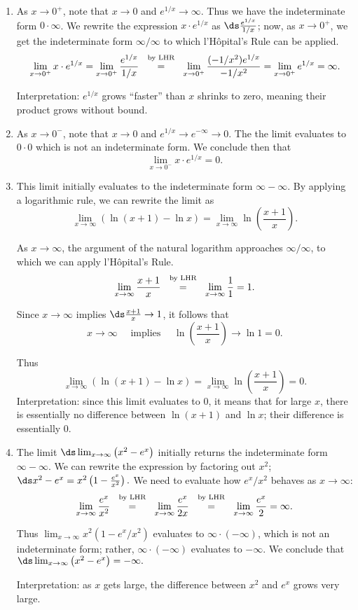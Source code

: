 {\begin{enumerate}
	\item	As $x\to 0^+$, note that $x\to 0$ and $e^{1/x}\to \infty$. Thus we have the indeterminate form $0\cdot\infty$. We rewrite the expression $x\cdot e^{1/x}$ as $\ds\frac{e^{1/x}}{1/x}$; now, as $x\to 0^+$, we get the indeterminate form $\infty/\infty$ to which l'H\^opital's Rule can be applied. 
\[
\lim_{x\to0^+} x\cdot e^{1/x} = \lim_{x\to 0^+} \frac{e^{1/x}}{1/x} \stackrel{\ \text{ by LHR \rule[-5pt]{0pt}{3pt}} \ }{=} \lim_{x\to 0^+}\frac{(-1/x^2)e^{1/x}}{-1/x^2} =\lim_{x\to 0^+}e^{1/x} =\infty.
\]

Interpretation: $e^{1/x}$ grows ``faster'' than $x$ shrinks to zero, meaning their product grows without bound.

	\item	As $x\to 0^-$, note that $x\to 0$ and $e^{1/x}\to e^{-\infty}\to 0$. The the limit evaluates to $0\cdot 0$ which is not an indeterminate form. We conclude then that $$\lim_{x\to 0^-}x\cdot e^{1/x} = 0.$$

	\item	This limit initially evaluates to the indeterminate form $\infty-\infty$. By applying a logarithmic rule, we can rewrite the limit as 
\[
\lim_{x\to\infty}\left(\ln(x+1)-\ln x\right) = \lim_{x\to \infty} \ln \left(\frac{x+1}x\right).
\]

As $x\to \infty$, the argument of the natural logarithm approaches $\infty/\infty$, to which we can apply l'H\^opital's Rule.
\[\lim_{x\to\infty} \frac{x+1}x \stackrel{\ \text{ by LHR \rule[-5pt]{0pt}{3pt}} \ }{=} \lim_{x\to\infty}\frac11=1.
\]

Since $x\to\infty$ implies $\ds\frac{x+1}x\to 1$, it follows that 
\[x\to\infty \quad \text{ implies }\quad \ln\left(\frac{x+1}x\right)\to\ln 1=0.\]

Thus
\[
 \lim_{x\to\infty} \left(\ln(x+1)-\ln x\right)
 = \lim_{x\to \infty} \ln \left(\frac{x+1}x\right)=0.
\]
Interpretation: since this limit evaluates to 0, it means that for large $x$, there is essentially no difference between $\ln (x+1)$ and $\ln x$; their difference is essentially 0.

	\item	The limit $\ds \lim_{x\to\infty} \left(x^2-e^x\right)$ initially returns the indeterminate form $\infty-\infty$. We can rewrite the expression by factoring out $x^2$; $\ds x^2-e^x = x^2\left(1-\frac{e^x}{x^2}\right).$ We need to evaluate how $e^x/x^2$ behaves as $x\to\infty$:
$$\lim_{x\to\infty}\frac{e^x}{x^2} \stackrel{\ \text{ by LHR \rule[-5pt]{0pt}{3pt}} \ }{=} \lim_{x\to\infty} \frac{e^x}{2x} \stackrel{\ \text{ by LHR \rule[-5pt]{0pt}{3pt}} \ }{=} \lim_{x\to\infty} \frac{e^x}{2} = \infty.$$

Thus $\lim_{x\to\infty}x^2(1-e^x/x^2)$ evaluates to $\infty\cdot(-\infty)$, which is not an indeterminate form; rather, $\infty\cdot(-\infty)$ evaluates to $-\infty$. We conclude that 
$\ds \lim_{x\to\infty} \left(x^2-e^x\right) = -\infty.$

Interpretation: as $x$ gets large, the difference between $x^2$ and $e^x$ grows very large.\eoehere
\end{enumerate}}


